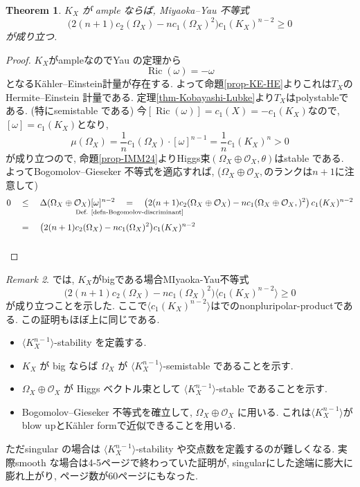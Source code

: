 \documentclass[dvipdfmx,a4paper,11pt]{article} %
\newtheorem{thm}{Theorem}[section]
\theoremstyle{definition}
\theoremstyle{remark}
\newtheorem{rem}[thm]{Remark}
\numberwithin{equation}{section}
\DeclareMathOperator{\Ric}{Ric}
\newcommand{\underalign}[2]{\quad \underset{\mathclap{\strut #1}}{#2}\quad}
\begin{document}
\begin{thm}
\(K_X\) が ample ならば, Miyaoka--Yau 不等式
\[
\bigl(2(n+1)c_2(\Omega_X)-n c_1(\Omega_X)^2\bigr)c_1(K_X)^{n-2}\geq 0
\]
が成り立つ.
\end{thm}
\begin{proof}
$K_X$がampleなのでYau の定理から
$$
\Ric(\omega) = - \omega 
$$
となるKähler--Einstein計量が存在する. 
よって命題\ref{prop-KE-HE}よりこれは$T_X$のHermite--Einstein 計量である.
定理\ref{thm-Kobayashi-Lubke}より$T_X$はpolystableである. (特にsemistable である)
今$[\Ric(\omega)]=c_1(X)=-c_1(K_X)$なので, $[\omega] =c_1(K_X)$となり, 
$$
\mu(\Omega_{X})
=\frac{1}{n}c_1(\Omega_{X}) \cdot  [\omega]^{n-1}
=\frac{1}{n}c_1(K_X)^n>0
$$
が成り立つので, 命題\ref{prop-IMM24}よりHiggs束$(\Omega_{X} \oplus \mathcal{O}_X, \theta)$はstable である. よってBogomolov--Gieseker 不等式を適応すれば, ($\Omega_{X} \oplus \mathcal{O}_X,$のランクは$n+1$に注意して)
\begin{align*}
0&\underalign{}{\le}
\Delta(\Omega_{X} \oplus \mathcal{O}_X) [\omega]^{n-2}
\underalign{\text{Def. \ref{defn-Bogomolov-discriminant}}}{=}
\left(2(n+1)c_2(\Omega_{X} \oplus \mathcal{O}_X)-nc_1(\Omega_{X} \oplus \mathcal{O}_X,)^2\right) c_1(K_X)^{n-2}
\\
&\underalign{}{=}
\bigl(2(n+1)c_2(\Omega_X)-n c_1(\Omega_X)^2\bigr)c_1(K_X)^{n-2}
\end{align*}
\end{proof}


\begin{rem}
\cite{IJZ25}では, $K_X$がbigである場合MIyaoka-Yau不等式
$$
\bigl(2(n+1)c_2(\Omega_X)-n c_1(\Omega_X)^2\bigr)
\langle c_1(K_X)^{n-2}\rangle \ge 0
$$
が成り立つことを示した. ここで$\langle c_1(K_X)^{n-2}\rangle$は\cite{BEGZ10}でのnonpluripolar-productである. この証明もほぼ上に同じである.
\begin{itemize}
\item \(\langle K_X^{n-1}\rangle\)-stability を定義する.
\item \(K_X\) が big ならば \(\Omega_X\) が \(\langle K_X^{n-1}\rangle\)-semistable であることを示す.
\item \(\Omega_X\oplus \mathcal{O}_X\) が Higgs ベクトル束として \(\langle K_X^{n-1}\rangle\)-stable であることを示す. 
\item Bogomolov--Gieseker 不等式を確立して, \(\Omega_X\oplus \mathcal{O}_X\) に用いる. これは\(\langle K_X^{n-1}\rangle\)がblow upとK\"ahler formで近似できることを用いる.
\end{itemize}
ただsingular の場合は \(\langle K_X^{n-1}\rangle\)-stability や交点数を定義するのが難しくなる. 実際smooth な場合は4-5ページで終わっていた証明が, singularにした途端に膨大に膨れ上がり, ページ数が60ページにもなった.
\end{rem}
\end{document}
